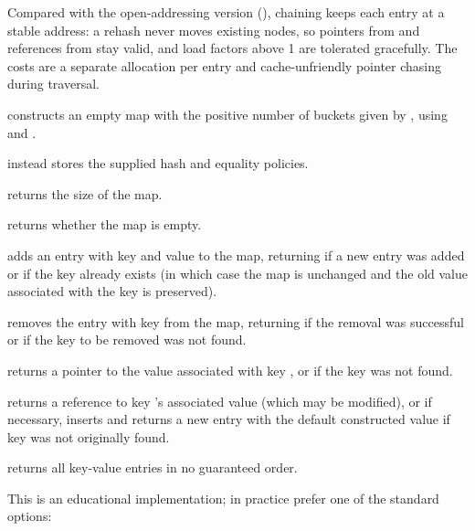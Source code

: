 Compared with the open-addressing version (), chaining keeps each entry at a stable address: a rehash never moves existing nodes, so pointers from  and references from  stay valid, and load factors above 1 are tolerated gracefully. The costs are a separate allocation per entry and cache-unfriendly pointer chasing during traversal.

\begin{compactitem}
  \item {} constructs an empty map with the positive number of buckets given by , using  and .
  \item {} instead stores the supplied hash and equality policies.
  \item {} returns the size of the map.
  \item {} returns whether the map is empty.
  \item {} adds an entry with key  and value  to the map, returning  if a new entry was added or  if the key already exists (in which case the map is unchanged and the old value associated with the key is preserved).
  \item {} removes the entry with key  from the map, returning  if the removal was successful or  if the key to be removed was not found.
  \item {} returns a pointer to the value associated with key , or  if the key was not found.
  \item {} returns a reference to key 's associated value (which may be modified), or if necessary, inserts and returns a new entry with the default constructed value if key  was not originally found.
  \item {} returns all key-value entries in no guaranteed order.
\end{compactitem}

This is an educational implementation; in practice prefer one of the standard options:

